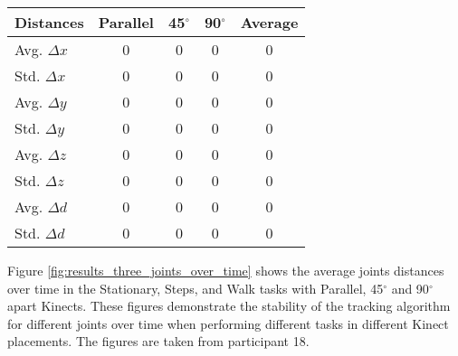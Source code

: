 \begin{table*}[!htb]
{    \begin{tabularx}{1.0\columnwidth}{||X c c c c||} 
     \hline
     \textbf{Distances} & \textbf{Parallel} & \textbf{45$^{\circ}$} & \textbf{90$^{\circ}$} & \textbf{Average} \\ [0.5ex] 
     \hline\hline
     Avg. $\Delta x$ & 0 & 0 & 0 & 0 \\
     \hline
     Std. $\Delta x$ & 0 & 0 & 0 & 0 \\
     \hline
     Avg. $\Delta y$ & 0 & 0 & 0 & 0 \\
     \hline
     Std. $\Delta y$ & 0 & 0 & 0 & 0 \\
     \hline
     Avg. $\Delta z$ & 0 & 0 & 0 & 0 \\
     \hline
     Std. $\Delta z$ & 0 & 0 & 0 & 0 \\
     \hline
     Avg. $\Delta d$ & 0 & 0 & 0 & 0 \\
     \hline
     Std. $\Delta d$ & 0 & 0 & 0 & 0 \\
     \hline
    \end{tabularx}    
  }
\caption{Average coordinates distances in the Walk task for three different Kinect configurations}
\label{table:results_three_coordinates_values}
\end{table*}

Figure \ref{fig:results_three_joints_over_time} shows the average joints distances over time in the Stationary, Steps, and Walk tasks with Parallel, 45$^{\circ}$ and 90$^{\circ}$ apart Kinects. These figures demonstrate the stability of the tracking algorithm for different joints over time when performing different tasks in different Kinect placements. The figures are taken from participant 18.

\FloatBarrier
\begin{figure*}[!htb]
  \centering

  \subfloat[Stationary]{
     
    
    
  } \\
  \subfloat[Steps]{
     
    
    
  } \\
  \subfloat[Walk]{
     
    
    
  }

  \caption{Average coordinates distances over time in the Stationary, Steps, and Walk tasks with Parallel, 45$^{\circ}$, and 90 $^{\circ}$ apart Kinects.}

  \label{fig:results_three_joints_over_time}
\end{figure*}

